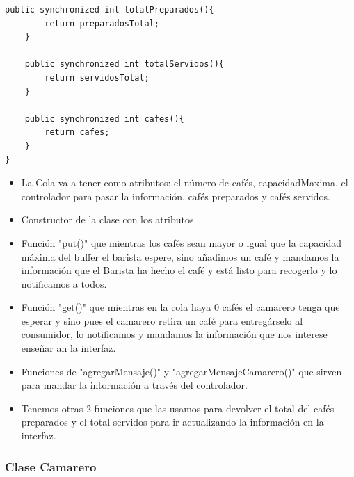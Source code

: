\documentclass[a4paper,12pt]{article}
\begin{document}
\begin{lstlisting}[style=javascript]
    public synchronized int totalPreparados(){
        return preparadosTotal;
    }

    public synchronized int totalServidos(){
        return servidosTotal;
    }

    public synchronized int cafes(){
        return cafes;
    }
}
\end{lstlisting}

\begin{itemize}
    \item La Cola va a tener como atributos: el número de cafés, capacidadMaxima, el controlador para pasar la información, cafés preparados y cafés servidos.
    \item Constructor de la clase con los atributos.
    \item Función "put()" que mientras los cafés sean mayor o igual que la capacidad máxima del buffer el barista espere, sino añadimos un café y mandamos la información que el Barista ha hecho el café y está listo para recogerlo y lo notificamos a todos.
    \item Función "get()" que mientras en la cola haya 0 cafés el camarero tenga que esperar y sino pues el camarero retira un café para entregárselo al consumidor, lo notificamos y mandamos la información que nos interese enseñar an la interfaz.
    \item Funciones de "agregarMensaje()" y "agregarMensajeCamarero()" que sirven para mandar la intormación a través del controlador.
    \item Tenemos otras 2 funciones que las usamos para devolver el total del cafés preparados y el total servidos para ir actualizando la información en la interfaz.
\end{itemize}


\subsubsection{Clase Camarero}
\end{document}
